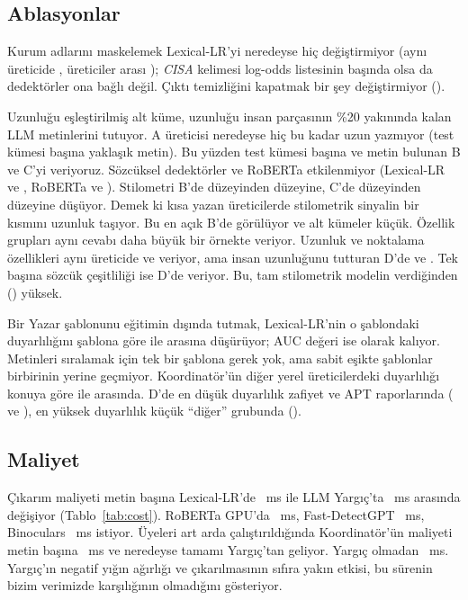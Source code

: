 \documentclass[journal]{IEEEtran}
\begin{document}
\subsection{Ablasyonlar}
Kurum adlarını maskelemek Lexical-LR'yi neredeyse hiç değiştirmiyor (aynı üreticide \AblLrMaskedIn{}, üreticiler
arası \AblLrMaskedCross{}); \emph{CISA} kelimesi log-odds listesinin başında olsa da dedektörler ona bağlı değil.
Çıktı temizliğini kapatmak bir şey değiştirmiyor (\AblLrNoCleanIn{}).

Uzunluğu eşleştirilmiş alt küme, uzunluğu insan parçasının \%20 yakınında kalan LLM metinlerini tutuyor. A üreticisi
neredeyse hiç bu kadar uzun yazmıyor (test kümesi başına yaklaşık \LenAN{} metin). Bu yüzden test kümesi başına
\LenBN{} ve \LenCN{} metin bulunan B ve C'yi veriyoruz. Sözcüksel dedektörler ve RoBERTa etkilenmiyor (Lexical-LR
\LenBLexLR{} ve \LenCLexLR{}, RoBERTa \LenBTrans{} ve \LenCTrans{}). Stilometri B'de \SameBStylo{} düzeyinden
\LenBStylo{} düzeyine, C'de \SameCStylo{} düzeyinden \LenCStylo{} düzeyine düşüyor. Demek ki kısa yazan üreticilerde
stilometrik sinyalin bir kısmını uzunluk taşıyor. Bu en açık B'de görülüyor ve alt kümeler küçük. Özellik grupları
aynı cevabı daha büyük bir örnekte veriyor. Uzunluk ve noktalama özellikleri aynı üreticide \AblGroupLengthIn{} ve
\AblGroupPunctuationIn{} veriyor, ama insan uzunluğunu tutturan D'de \AblGroupLengthD{} ve
\AblGroupPunctuationD{}. Tek başına sözcük çeşitliliği ise D'de \AblGroupLexicalD{} veriyor. Bu, tam stilometrik
modelin verdiğinden (\AblStylometryD{}) yüksek.

Bir Yazar şablonunu eğitimin dışında tutmak, Lexical-LR'nin o şablondaki duyarlılığını şablona göre
\TplRecallMin{} ile \TplRecallMax{} arasına düşürüyor; AUC değeri ise \TplAucMin{} olarak kalıyor. Metinleri
sıralamak için tek bir şablona gerek yok, ama sabit eşikte şablonlar birbirinin yerine geçmiyor. Koordinatör'ün
diğer yerel üreticilerdeki duyarlılığı konuya göre \TopicCrossMin{} ile \TopicCrossMax{} arasında. D'de en düşük
duyarlılık zafiyet ve APT raporlarında (\TopicDVulnerability{} ve \TopicDApt{}), en yüksek duyarlılık küçük
``diğer'' grubunda (\TopicDOther{}).


\subsection{Maliyet}
Çıkarım maliyeti metin başına Lexical-LR'de \MsLexLR{}~ms ile LLM Yargıç'ta \MsJudge{}~ms arasında değişiyor
(Tablo~\ref{tab:cost}). RoBERTa GPU'da \MsTrans{}~ms, Fast-DetectGPT \MsFast{}~ms, Binoculars \MsBino{}~ms
istiyor. Üyeleri art arda çalıştırıldığında Koordinatör'ün maliyeti metin başına \MsCoord{}~ms ve neredeyse tamamı
Yargıç'tan geliyor. Yargıç olmadan \MsCoordNoJudge{}~ms. Yargıç'ın negatif yığın ağırlığı ve çıkarılmasının
sıfıra yakın etkisi, bu sürenin bizim verimizde karşılığının olmadığını gösteriyor.
\end{document}
